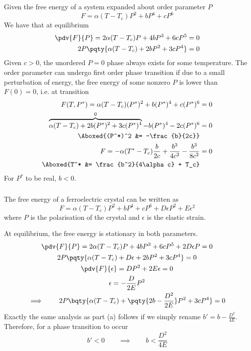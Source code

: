 \documentclass[12pt]{article}
\begin{document}
     \subsection{}  \subsubsection{} Given the free energy of a system expanded about order parameter \(P\) \[
        F = \alpha (T - T_c)P^2 + b P^4 + c P^6
    \]
    We have that at equilibrium \begin{align*}
        \pdv{F}{P} = 2 \alpha (T - T_c) P + 4b P^3 + 6cP^5 &=  0\\
        2P\pqty{ \alpha (T - T_c)  + 2b P^2 + 3cP^4} &=  0
    \end{align*}
    Given \(c > 0\), the unordered \(P = 0\) phase always exists for some temperature. The order parameter can undergo first order phase transition if due to a small perturbation of energy, the free energy of some nonzero \(P\) is lower than \(F(0) = 0\), i.e. at transition \begin{align*}
        F(T, P^*) =\alpha (T - T_c)(P^*)^2 + b (P^*)^4 + c (P^*)^6 &=  0\\
        \overbrace{ \alpha (T - T_c)  + 2b (P^*)^2 + 3c(P^*)^4}^{0} - b(P^*)^4 - 2c (P^*)^6 &= 0\\
        \Aboxed{(P^*)^2 &= -\frac{b}{2c}}\\
        F =-\alpha(T^* - T_c) \frac{b}{2c} + \frac{b^3}{4c^2} - \frac{b^3}{8c^2} &= 0\\
        \Aboxed{T^* &= \frac{b^2}{4\alpha c} + T_c}
    \end{align*}
    For \(P^*\) to be real, \(b < 0\).
     \subsubsection{}  The free energy of a ferroelectric crystal can be written as
    \[
        F = \alpha(T - T_c) P^2 + bP^4 + cP^6 + D \epsilon P^2 + E \epsilon^2
    \]
    where \(P\) is the polarisation of the crystal and \(\epsilon\) is the elastic strain. 

    At equilibrium, the free energy is stationary in both parameters. \begin{gather*}
        \pdv{F}{P} = 2 \alpha (T - T_c) P + 4b P^3 + 6cP^5 + 2D \epsilon P =  0\\
        2P\pqty{ \alpha (T - T_c) + D\epsilon  + 2b P^2 + 3cP^4} =  0\\
        \pdv{F}{\epsilon} = D P^2 + 2E \epsilon = 0\\
        \epsilon = -\frac{D}{2E} P^2\\
        \implies\qquad 2P\bqty{ \alpha (T - T_c) + \pqty{2b -\frac{D^2}{2E} }P^2 + 3cP^4} =  0
    \end{gather*}
    Exactly the same analysis as part (a) follows if we simply rename \(b' = b - \frac{D^2}{4E}\). Therefore, for a phase transition to occur \[
        b' < 0 \qquad \implies\qquad b < \frac{D^2}{4E}
    \]
\end{document}
